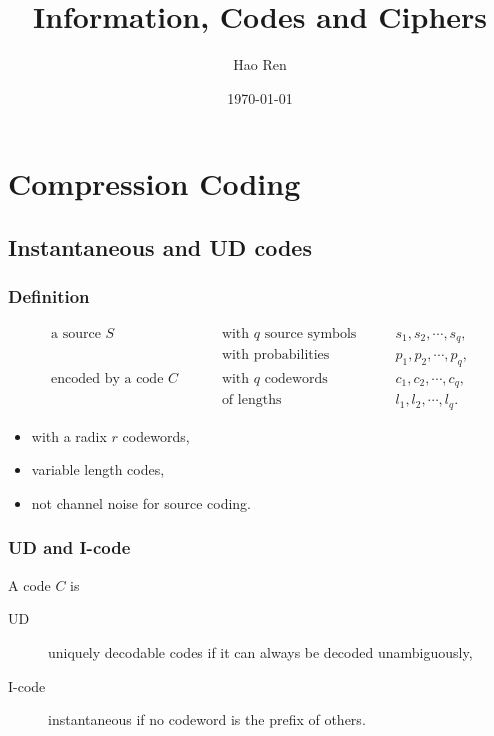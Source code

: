 \documentclass{article}
\begin{document}
\title{Information, Codes and Ciphers}
\author{Hao Ren}
\date{\today}
\maketitle

\setcounter{section}{2}

\newpage

\section{Compression Coding}

\subsection{Instantaneous and UD codes}

\subsubsection{Definition}

\begin{align*}
	\text{a source } S \qquad &\text{ with } q \text{ source symbols} \qquad & s_{1},s_{2},\cdots,s_{q},\\
	&\text{ with probabilities} \qquad &  p_{1},p_{2},\cdots,p_{q},\\
	\text{encoded by a code } C \qquad &\text{ with } q \text{ codewords} \qquad & c_{1},c_{2},\cdots,c_{q},\\
	&\text{ of lengths} \qquad & l_{1},l_{2},\cdots,l_{q}.
\end{align*}

\begin{itemize}
	\item with a radix $r$ codewords,
	\item variable length codes,
	\item not channel noise for source coding.
\end{itemize}

\subsubsection{UD and I-code}

A code $C$ is

\begin{description}
	\item[UD] uniquely decodable codes if it can always be decoded unambiguously,
	\item[I-code] instantaneous if no codeword is the prefix of others.
\end{description}
\end{document}
